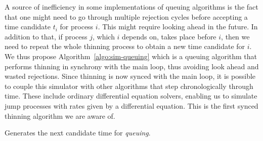 \documentclass{juliacon}
\numberwithin{equation}{section}
\newcommand\ubar[1]{\stackunder[1.2pt]{\(#1\)}{\rule{.8ex}{.075ex}}}
\begin{document}
A source of inefficiency in some implementations of queuing algorithms is the fact that one might need to go through multiple rejection cycles before accepting a time candidate \( t_i \) for process \( i \). This might require looking ahead in the future. In addition to that, if process \( j \), which \( i \) depends on, takes place before \( i \), then we need to repeat the whole thinning process to obtain a new time candidate for \( i \). We thus propose Algorithm~\ref{algo:sim-queuing} which is a queuing algorithm that performs thinning in synchrony with the main loop, thus avoiding look ahead and wasted rejections. Since thinning is now synced with the main loop, it is possible to couple this simulator with other algorithms that step chronologically through time. These include ordinary differential equation solvers, enabling us to simulate jump processes with rates given by a differential equation. This is the first synced thinning algorithm we are aware of.

\begin{algorithm}[h]
\caption{Generates the next candidate time for \textit{queuing}.}
\label{algo:next-time-queuing}
\end{algorithm}
\end{document}
